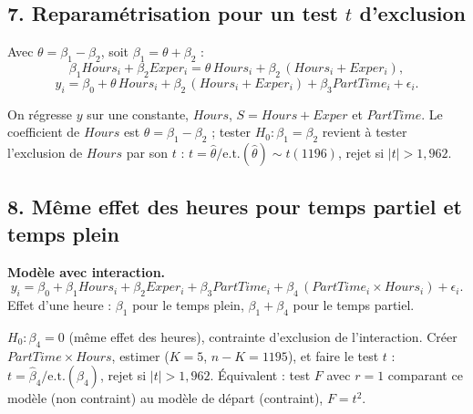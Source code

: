 \documentclass[11pt,a4paper]{article}
\begin{document}
\subsection*{7. Reparamétrisation pour un test $t$ d'exclusion}
Avec $\theta=\beta_1-\beta_2$, soit $\beta_1=\theta+\beta_2$ :
\[
\beta_1Hours_i+\beta_2Exper_i=\theta\,Hours_i+\beta_2\,(Hours_i+Exper_i),
\]
\[
y_i=\beta_0+\theta\,Hours_i+\beta_2\,(Hours_i+Exper_i)+\beta_3PartTime_i+\epsilon_i .
\]
\begin{reponse}
On régresse $y$ sur une constante, $Hours$, $S=Hours+Exper$ et $PartTime$. Le coefficient de $Hours$ est $\theta=\beta_1-\beta_2$ ; tester $H_0:\beta_1=\beta_2$ revient à tester l'exclusion de $Hours$ par son $t$ : $t=\hat\theta/\text{e.t.}(\hat\theta)\sim t(1196)$, rejet si $|t|>1{,}962$.
\end{reponse}

\subsection*{8. Même effet des heures pour temps partiel et temps plein}
\textbf{Modèle avec interaction.}
\[
y_i=\beta_0+\beta_1Hours_i+\beta_2Exper_i+\beta_3PartTime_i+\beta_4\,(PartTime_i\times Hours_i)+\epsilon_i .
\]
Effet d'une heure : $\beta_1$ pour le temps plein, $\beta_1+\beta_4$ pour le temps partiel.
\begin{reponse}
$H_0:\beta_4=0$ (même effet des heures), contrainte d'exclusion de l'interaction. Créer $PartTime\times Hours$, estimer ($K=5$, $n-K=1195$), et faire le test $t$ : $t=\hat\beta_4/\text{e.t.}(\hat\beta_4)$, rejet si $|t|>1{,}962$. Équivalent : test $F$ avec $r=1$ comparant ce modèle (non contraint) au modèle de départ (contraint), $F=t^2$.
\end{reponse}
\end{document}
